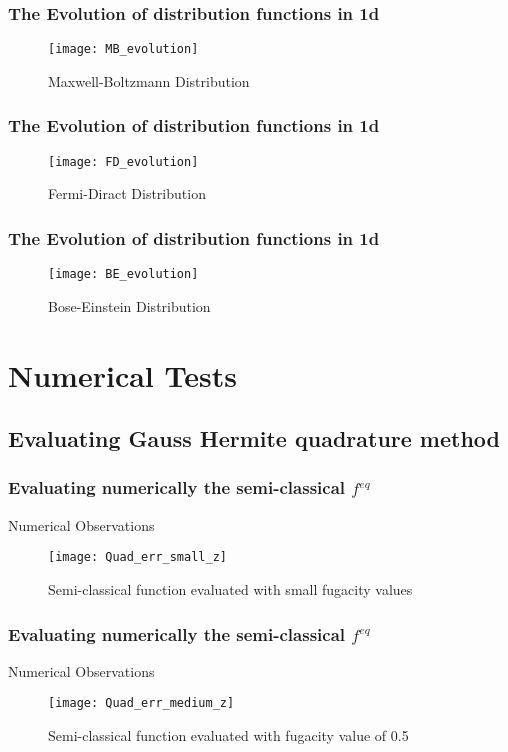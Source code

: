 \documentclass[11pt,fleqn]{beamer}
\begin{document}
\begin{frame}
	\frametitle{The Evolution of distribution functions in 1d}
	\begin{figure}[p7]
	\centering
	\texttt{[image: MB\_evolution]}%
	\caption{Maxwell-Boltzmann Distribution}
	\end{figure}
\end{frame}

\begin{frame}
	\frametitle{The Evolution of distribution functions in 1d}
	\begin{figure}[p8]
	\centering
	\texttt{[image: FD\_evolution]}%
	\caption{Fermi-Diract Distribution}
	\end{figure}
\end{frame}

\begin{frame}
	\frametitle{The Evolution of distribution functions in 1d}
	\begin{figure}[p9]
	\centering
	\texttt{[image: BE\_evolution]}%
	\caption{Bose-Einstein Distribution}
	\end{figure}
\end{frame}

\section{Numerical Tests}
\subsection{Evaluating Gauss Hermite quadrature method}
\begin{frame}
	\frametitle{Evaluating numerically the semi-classical $f^{eq}$}
	Numerical Observations
	\begin{figure}[small_z]
	\centering
	\texttt{[image: Quad\_err\_small\_z]}%
	\caption{Semi-classical function evaluated with small fugacity values}
	\end{figure}
\end{frame}

\begin{frame}
	\frametitle{Evaluating numerically the semi-classical $f^{eq}$}
	Numerical Observations
	\begin{figure}[medium_z]
	\centering
	\texttt{[image: Quad\_err\_medium\_z]}%
	\caption{Semi-classical function evaluated with fugacity value of 0.5}
	\end{figure}
\end{frame}
\end{document}
